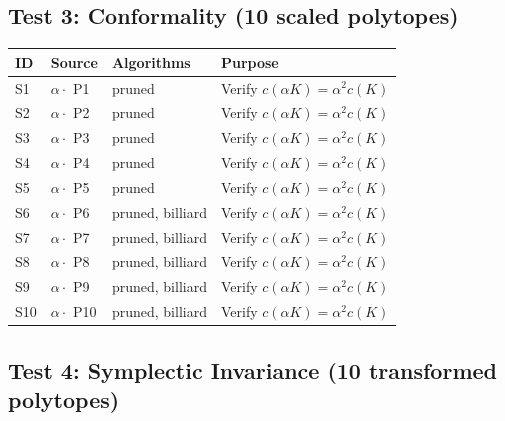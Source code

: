 \documentclass{article}
\begin{document}
\subsection*{Test 3: Conformality (10 scaled polytopes)}

\begin{tabular}{lllp{5cm}}
\toprule
ID & Source & Algorithms & Purpose \\
\midrule
S1 & $\alpha \cdot$ P1 & pruned & Verify $c(\alpha K) = \alpha^2 c(K)$ \\
S2 & $\alpha \cdot$ P2 & pruned & Verify $c(\alpha K) = \alpha^2 c(K)$ \\
S3 & $\alpha \cdot$ P3 & pruned & Verify $c(\alpha K) = \alpha^2 c(K)$ \\
S4 & $\alpha \cdot$ P4 & pruned & Verify $c(\alpha K) = \alpha^2 c(K)$ \\
S5 & $\alpha \cdot$ P5 & pruned & Verify $c(\alpha K) = \alpha^2 c(K)$ \\
S6 & $\alpha \cdot$ P6 & pruned, billiard & Verify $c(\alpha K) = \alpha^2 c(K)$ \\
S7 & $\alpha \cdot$ P7 & pruned, billiard & Verify $c(\alpha K) = \alpha^2 c(K)$ \\
S8 & $\alpha \cdot$ P8 & pruned, billiard & Verify $c(\alpha K) = \alpha^2 c(K)$ \\
S9 & $\alpha \cdot$ P9 & pruned, billiard & Verify $c(\alpha K) = \alpha^2 c(K)$ \\
S10 & $\alpha \cdot$ P10 & pruned, billiard & Verify $c(\alpha K) = \alpha^2 c(K)$ \\
\bottomrule
\end{tabular}

\subsection*{Test 4: Symplectic Invariance (10 transformed polytopes)}
\end{document}
